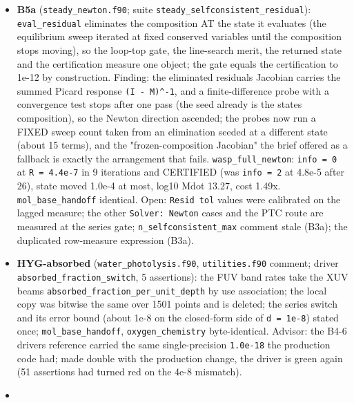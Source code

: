 \documentclass[english,a4paper]{my_memo}
\begin{document}
\begin{itemize}
  shipped. Noted for the user: the shipped default \texttt{Resid\ tol} 1e-5 is one
  to two decades looser than the solve reaches at no cost.
\item
  \textbf{B5a} (\texttt{steady\_newton.f90}; suite \texttt{steady\_selfconsistent\_residual}):
  \texttt{eval\_residual} eliminates the composition AT the state it evaluates
  (the equilibrium sweep iterated at fixed conserved variables until the
  composition stops moving), so the loop-top gate, the line-search merit,
  the returned state and the certification measure one object; the gate
  equals the certification to 1e-12 by construction. Finding: the
  eliminated residual\textquotesingle s Jacobian carries the summed Picard response
  \texttt{(I\ -\ M)\^{}-1}, and a finite-difference probe with a convergence test stops
  after one pass (the seed already is the state\textquotesingle s composition), so the
  Newton direction ascended; the probes now run a FIXED sweep count taken
  from an elimination seeded at a different state (about 15 terms), and the
  "frozen-composition Jacobian" the brief offered as a fallback is exactly
  the arrangement that fails. \texttt{wasp\_full\_newton}: \texttt{info\ =\ 0} at
  \texttt{\textbar{}\textbar{}R\textbar{}\textbar{}\ =\ 4.4e-7} in 9 iterations and CERTIFIED (was \texttt{info\ =\ 2} at
  4.8e-5 after 26), state moved 1.0e-4 at most, log10 Mdot 13.27, cost
  1.49x. \texttt{mol\_base\_handoff} identical. Open: \texttt{Resid\ tol} values were
  calibrated on the lagged measure; the other \texttt{Solver:\ Newton} cases and
  the PTC route are measured at the series gate; \texttt{n\_selfconsistent\_max}
  comment stale (B3a); the duplicated row-measure expression (B3a).
\item
  \textbf{HYG-absorbed} (\texttt{water\_photolysis.f90}, \texttt{utilities.f90} comment; driver
  \texttt{absorbed\_fraction\_switch}, 5 assertions): the FUV band rates take the XUV
  beam\textquotesingle s \texttt{absorbed\_fraction\_per\_unit\_depth} by use association; the local
  copy was bitwise the same over 1501 points and is deleted; the series
  switch and its error bound (about 1e-8 on the closed-form side of
  \texttt{d\ =\ 1e-8}) stated once; \texttt{mol\_base\_handoff}, \texttt{oxygen\_chemistry}
  byte-identical. Advisor: the B4-6 driver\textquotesingle s reference carried the same
  single-precision \texttt{1.0e-18} the production code had; made double with the
  production change, the driver is green again (51 assertions had turned red
  on the 4e-8 mismatch).
\item

\end{itemize}
\end{document}
